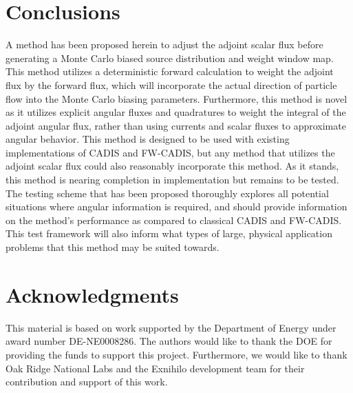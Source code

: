 \documentclass{mc2015}
\begin{document}
\section{Conclusions}
\label{sec:conclusions}

A method has been proposed herein to adjust the adjoint scalar flux before generating a Monte Carlo biased source distribution and weight window map. 
This method utilizes a deterministic forward calculation to weight the adjoint flux by the forward flux, which will incorporate the actual direction of particle flow into the Monte Carlo biasing parameters. 
Furthermore, this method is novel as it utilizes explicit angular fluxes and quadratures to weight the integral of the adjoint angular flux, rather than using currents and scalar fluxes to approximate angular behavior. 
This method is designed to be used with existing implementations of CADIS and FW-CADIS, but any method that utilizes the adjoint scalar flux could also reasonably incorporate this method. 
As it stands, this method is nearing completion in implementation but remains to be tested. 
The testing scheme that has been proposed thoroughly explores all potential situations where angular information is required, and should provide information on the method's performance as compared to classical CADIS and FW-CADIS. 
This test framework will also inform what types of large, physical application problems that this method may be suited towards. 


\section{Acknowledgments}

This material is based on work supported by the Department of Energy under award number DE-NE0008286. The authors would like to thank the DOE for providing the funds to support this project. Furthermore, we would like to thank Oak Ridge National Labs and the Exnihilo development team for their contribution and support of this work. 

\setlength{\baselineskip}{12pt}




\end{document}
